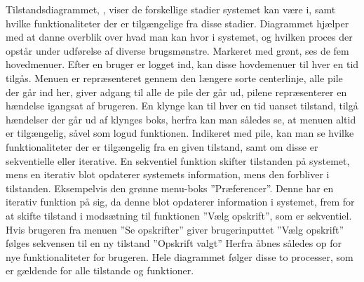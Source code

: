 Tilstandsdiagrammet, , viser de forskellige stadier systemet kan være i, samt hvilke funktionaliteter der er tilgængelige fra disse stadier.
Diagrammet hjælper med at danne overblik over hvad man kan hvor i systemet, og hvilken proces der opstår under udførelse af diverse brugsmønstre.
Markeret med grønt, ses de fem hovedmenuer.
Efter en bruger er logget ind, kan disse hovdemenuer til hver en tid tilgås.
Menuen er repræsenteret gennem den længere sorte centerlinje,  alle pile der går ind her, giver adgang til alle de pile der går ud, pilene repræsenterer en hændelse igangsat af brugeren.
En klynge kan  til hver en tid uanset tilstand, tilgå hændelser der går ud af klynges boks, herfra kan man således se, at menuen altid er tilgængelig, såvel som logud funktionen.
Indikeret med pile, kan man se hvilke funktionaliteter der er tilgængelig fra en given tilstand, samt om disse er sekventielle eller iterative.
En sekventiel funktion skifter tilstanden på systemet, mens en iterativ blot opdaterer systemets information, mens den forbliver i tilstanden.
Eksempelvis den grønne menu-boks ''Præferencer''.
Denne har en iterativ funktion på sig, da denne blot opdaterer information i systemet, frem for at skifte tilstand i modsætning til funktionen ''Vælg opskrift'', som er sekventiel.
Hvis brugeren fra menuen ''Se opskrifter'' giver brugerinputtet ''Vælg opskrift'' følges sekvensen til en ny tilstand ''Opskrift valgt'' Herfra åbnes således op for nye funktionaliteter for brugeren.
Hele diagrammet følger disse to processer, som er gældende for alle tilstande og funktioner.\label{tdiabeskriv}
